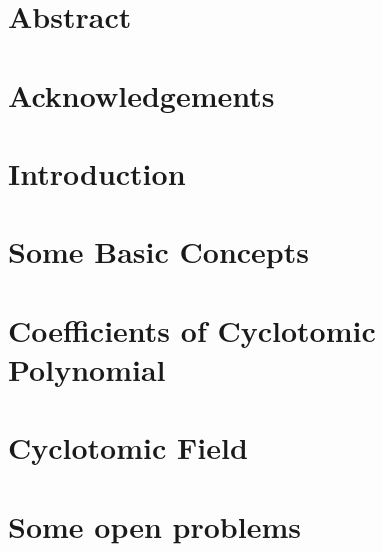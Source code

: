 \documentclass[12pt]{report}
\theoremstyle{definition}
\begin{document}
\chapter*{Abstract}






\chapter*{Acknowledgements}



\clearpage


\tableofcontents

\chapter{Introduction}





\chapter{Some Basic Concepts}


\chapter{Coefficients of Cyclotomic Polynomial}



\appendix

\chapter{Cyclotomic Field}


\chapter{Some open problems}


\printbibliography


 
\end{document}
